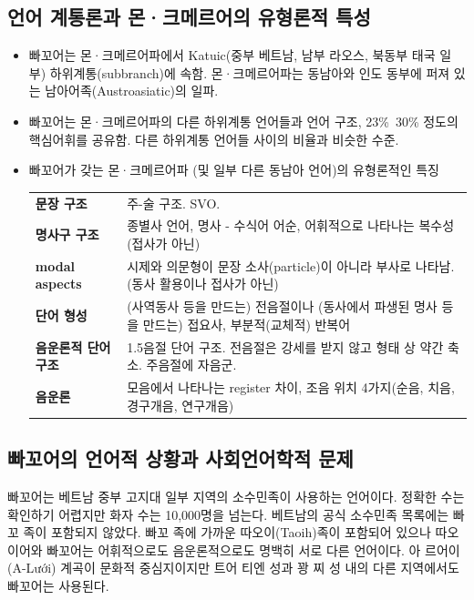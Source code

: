 \subsection{언어 계통론과 몬·크메르어의 유형론적 특성}
\begin{itemize}
\item 빠꼬어는 몬·크메르어파에서 Katuic(중부 베트남, 남부 라오스, 북동부 태국 일부) 하위계통(subbranch)에 속함. 몬·크메르어파는 동남아와 인도 동부에 퍼져 있는 남아어족(Austroasiatic)의 일파.

\item 빠꼬어는 몬·크메르어파의 다른 하위계통 언어들과 언어 구조, 23\%~30\% 정도의 핵심어휘를 공유함. 다른 하위계통 언어들 사이의 비율과 비슷한 수준.

\item 빠꼬어가 갖는 몬·크메르어파 (및 일부 다른 동남아 언어)의 유형론적인 특징
\begin{center}
\begin{tabular}{lp{.7\linewidth}}
\hline
\textbf{문장 구조}& 주-술 구조. SVO.\\
\textbf{명사구 구조}& 종별사 언어, 명사 - 수식어 어순, 어휘적으로 나타나는 복수성 (접사가 아닌)\\
\textbf{modal aspects}& 시제와 의문형이 문장 소사(particle)이 아니라 부사로 나타남. (동사 활용이나 접사가 아닌)\\
\textbf{단어 형성}& (사역동사 등을 만드는) 전음절이나 (동사에서 파생된 명사 등을 만드는) 접요사, 부분적(교체적) 반복어\\
\textbf{음운론적 단어 구조}& 1.5음절 단어 구조. 전음절은 강세를 받지 않고 형태 상 약간 축소. 주음절에 자음군.\\
\textbf{음운론}& 모음에서 나타나는 register 차이, 조음 위치 4가지(순음, 치음, 경구개음, 연구개음)\\
\hline
\end{tabular}
\end{center}
\end{itemize}

\subsection{빠꼬어의 언어적 상황과 사회언어학적 문제}
빠꼬어는 베트남 중부 고지대 일부 지역의 소수민족이 사용하는 언어이다. 정확한 수는 확인하기 어렵지만 화자 수는 10,000명을 넘는다. 베트남의 공식 소수민족 목록에는 빠꼬 족이 포함되지 않았다. 빠꼬 족에 가까운 따오이(Taoih)족이 포함되어 있으나 따오이어와 빠꼬어는 어휘적으로도 음운론적으로도 명백히 서로 다른 언어이다. 아 르어이(A-Lưới) 계곡이 문화적 중심지이지만 트어 티엔 성과 꽝 찌 성 내의 다른 지역에서도 빠꼬어는 사용된다.

